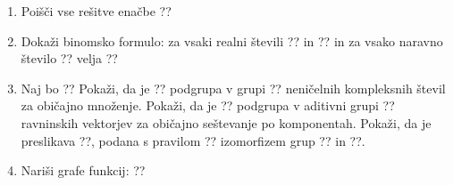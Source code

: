 \documentclass[a4paper,12pt]{article}
\begin{document}
\begin{enumerate}
\item Poišči vse rešitve enačbe
??

\item Dokaži binomsko formulo: za vsaki realni števili ?? in ?? in za vsako naravno število ?? velja
??

\item Naj bo
??
Pokaži, da je ?? podgrupa v grupi ??
neničelnih kompleksnih števil za običajno množenje.
Pokaži, da je ?? podgrupa v aditivni grupi ??
ravninskih vektorjev za običajno seštevanje po komponentah.
Pokaži, da je preslikava ??, podana s pravilom
??
izomorfizem grup ?? in ??.

\item Nariši grafe funkcij:
??
\end{enumerate}
\end{document}
